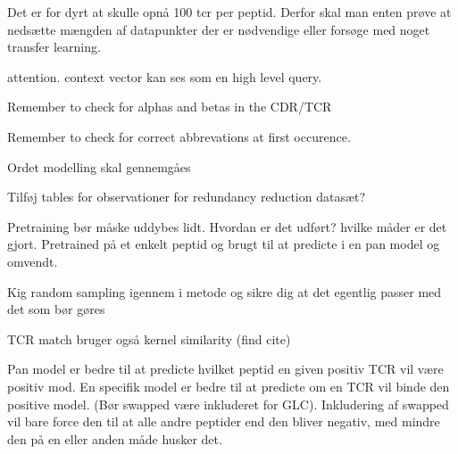 Det er for dyrt at skulle opnå 100 tcr per peptid. Derfor skal man enten prøve at nedsætte mængden af datapunkter der er nødvendige eller forsøge med noget transfer learning.

attention. context vector kan ses som en high level query. 

Remember to check for alphas and betas in the CDR/TCR 

Remember to check for correct abbrevations at first occurence.

Ordet modelling skal gennemgåes

Tilføj tables for observationer for redundancy reduction datasæt?

Pretraining bør måske uddybes lidt. Hvordan er det udført? hvilke måder er det gjort. Pretrained på et enkelt peptid og brugt til at predicte i en pan model og omvendt.

Kig random sampling igennem i metode og sikre dig at det egentlig passer med det som bør gøres

TCR match bruger også kernel similarity (find cite)

Pan model er bedre til at predicte hvilket peptid en given positiv TCR vil være positiv mod. En specifik model er bedre til at predicte om en TCR vil binde den positive model. (Bør swapped være inkluderet for GLC). Inkludering af swapped vil bare force den til at alle andre peptider end den bliver negativ, med mindre den på en eller anden måde husker det.

